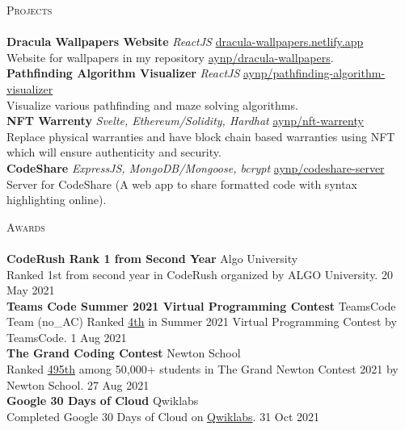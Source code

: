 \documentclass[a4paper]{article}
\newcommand{\lineunder} {
    \vspace*{-8pt} \\
    \hspace*{-18pt} \hrulefill \\
}
\newcommand{\header} [1] {
    {\hspace*{-18pt}\vspace*{6pt} \textsc{#1}}
    \vspace*{-6pt} \lineunder
}
\begin{document}
\header{Projects}
{\textbf{Dracula Wallpapers Website}} {\sl ReactJS} \hfill \href{https://dracula-wallpapers.netlify.app/}{dracula-wallpapers.netlify.app}\\
Website for wallpapers in my repository \href{https://github.com/aynp/dracula-wallpapers}{aynp/dracula-wallpapers}.\\
\vspace*{2mm}
{\textbf{Pathfinding Algorithm Visualizer}} {\sl ReactJS} \hfill \href{https://github.com/aynp/pathfinding-algorithm-visualizer}{aynp/pathfinding-algorithm-visualizer}\\
Visualize various pathfinding and maze solving algorithms.\\
\vspace*{2mm}
{\textbf{NFT Warrenty}} {\sl Svelte, Ethereum/Solidity, Hardhat} \hfill \href{https://github.com/aynp/nft-warrenty}{aynp/nft-warrenty}\\
Replace physical warranties and have block chain based warranties using NFT which will ensure authenticity and security.\\
\vspace*{2mm}
{\textbf{CodeShare}} {\sl ExpressJS, MongoDB/Mongoose, bcrypt} \hfill \href{https://github.com/aynp/codeshare-server}{aynp/codeshare-server}\\
Server for CodeShare (A web app to share formatted code with syntax highlighting online).\\
\vspace*{2mm}

\header{Awards}
\textbf{CodeRush Rank 1 from Second Year} \hfill Algo University\\
Ranked 1st from second year in CodeRush organized by ALGO University. \hfill 20 May 2021\\
\vspace*{2mm}
\textbf{Teams Code Summer 2021 Virtual Programming Contest} \hfill TeamsCode\\
Team (no\_AC) Ranked \href{https://youtu.be/eCylTCHctY0?t=16137}{4th} in Summer 2021 Virtual Programming Contest by TeamsCode. \hfill 1 Aug 2021\\
\vspace*{2mm}
\textbf{The Grand Coding Contest} \hfill Newton School\\
Ranked \href{https://www.linkedin.com/posts/aryanpathania03_aryan-has-secured-rank-495-in-newtons-grand-activity-6841777869484642304-YhKD}{495th} among 50,000+ students in The Grand Newton Contest 2021 by Newton School. \hfill 27 Aug 2021\\
\vspace*{2mm}
\textbf{Google 30 Days of Cloud} \hfill Qwiklabs\\
Completed Google 30 Days of Cloud on \href{https://www.qwiklabs.com/public_profiles/4c78c6d8-ad43-4991-b8fe-03e559c1bac5}{Qwiklabs}. \hfill 31 Oct 2021\\
\vspace*{2mm}
\end{document}
